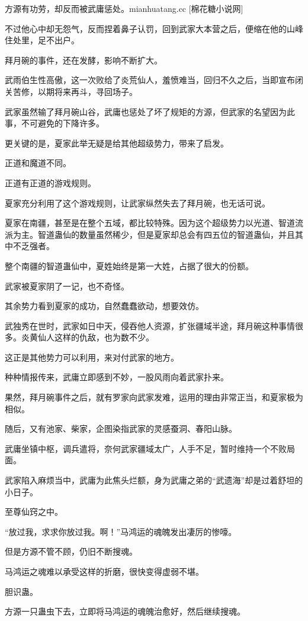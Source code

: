 \begin{this_body}
方源有功劳，却反而被武庸惩处。mianhuatang.cc [棉花糖小说网]

不过他心中却无怨气，反而捏着鼻子认罚，回到武家大本营之后，便缩在他的山峰住处里，足不出户。

拜月碗的事件，还在发酵，影响不断扩大。

武雨伯生性高傲，这一次败给了炎荒仙人，羞愤难当，回归不久之后，当即宣布闭关苦修，以期将来再斗，寻回场子。

武家虽然输了拜月碗山谷，武庸也惩处了坏了规矩的方源，但武家的名望因为此事，不可避免的下降许多。

更关键的是，夏家此举无疑是给其他超级势力，带来了启发。

正道和魔道不同。

正道有正道的游戏规则。

夏家充分利用了这个游戏规则，让武家纵然失去了拜月碗，也无话可说。

夏家在南疆，甚至是在整个五域，都比较特殊。因为这个超级势力以光道、智道流派为主。智道蛊仙的数量虽然稀少，但是夏家却总会有四五位的智道蛊仙，并且其中不乏强者。

整个南疆的智道蛊仙中，夏姓始终是第一大姓，占据了很大的份额。

武家被夏家阴了一记，也不奇怪。

其余势力看到夏家的成功，自然蠢蠢欲动，想要效仿。

武独秀在世时，武家如日中天，侵吞他人资源，扩张疆域半途，拜月碗这种事情很多。炎黄仙人这样的仇敌，也为数不少。

这正是其他势力可以利用，来对付武家的地方。

种种情报传来，武庸立即感到不妙，一股风雨向着武家扑来。

果然，拜月碗事件之后，就有罗家向武家发难，运用的理由非常正当，和夏家极为相似。

随后，又有池家、柴家，企图染指武家的灵感蚕洞、春阳山脉。

武庸坐镇中枢，调兵遣将，奈何武家疆域太广，人手不足，暂时维持一个不败局面。

武家陷入麻烦当中，武庸为此焦头烂额，身为武庸之弟的“武遗海”却是过着舒坦的小日子。

至尊仙窍之中。

“放过我，求求你放过我。啊！”马鸿运的魂魄发出凄厉的惨嚎。

但是方源不管不顾，仍旧不断搜魂。

马鸿运之魂难以承受这样的折磨，很快变得虚弱不堪。

胆识蛊。

方源一只蛊虫下去，立即将马鸿运的魂魄治愈好，然后继续搜魂。


\end{this_body}
